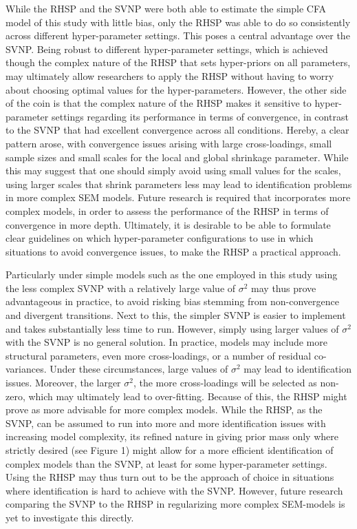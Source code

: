 \documentclass[
  man, donotrepeattitle,floatsintext]{apa6}
\begin{document}
While the RHSP and the SVNP were both able to estimate the simple CFA model of this study with little bias, only the RHSP was able to do so consistently across different hyper-parameter settings. This poses a central advantage over the SVNP. Being robust to different hyper-parameter settings, which is achieved though the complex nature of the RHSP that sets hyper-priors on all parameters, may ultimately allow researchers to apply the RHSP without having to worry about choosing optimal values for the hyper-parameters. However, the other side of the coin is that the complex nature of the RHSP makes it sensitive to hyper-parameter settings regarding its performance in terms of convergence, in contrast to the SVNP that had excellent convergence across all conditions. Hereby, a clear pattern arose, with convergence issues arising with large cross-loadings, small sample sizes and small scales for the local and global shrinkage parameter. While this may suggest that one should simply avoid using small values for the scales, using larger scales that shrink parameters less may lead to identification problems in more complex SEM models. Future research is required that incorporates more complex models, in order to assess the performance of the RHSP in terms of convergence in more depth. Ultimately, it is desirable to be able to formulate clear guidelines on which hyper-parameter configurations to use in which situations to avoid convergence issues, to make the RHSP a practical approach.

Particularly under simple models such as the one employed in this study using the less complex SVNP with a relatively large value of \(\sigma^2\) may thus prove advantageous in practice, to avoid risking bias stemming from non-convergence and divergent transitions. Next to this, the simpler SVNP is easier to implement and takes substantially less time to run. However, simply using larger values of \(\sigma^2\) with the SVNP is no general solution. In practice, models may include more structural parameters, even more cross-loadings, or a number of residual co-variances. Under these circumstances, large values of \(\sigma^2\) may lead to identification issues. Moreover, the larger \(\sigma^2\), the more cross-loadings will be selected as non-zero, which may ultimately lead to over-fitting. Because of this, the RHSP might prove as more advisable for more complex models. While the RHSP, as the SVNP, can be assumed to run into more and more identification issues with increasing model complexity, its refined nature in giving prior mass only where strictly desired (see Figure 1) might allow for a more efficient identification of complex models than the SVNP, at least for some hyper-parameter settings. Using the RHSP may thus turn out to be the approach of choice in situations where identification is hard to achieve with the SVNP. However, future research comparing the SVNP to the RHSP in regularizing more complex SEM-models is yet to investigate this directly.
\end{document}
